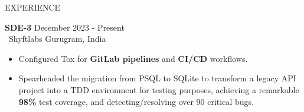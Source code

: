 \documentclass{resume} %
\begin{document}
\begin{rSection}{EXPERIENCE}
		
	\textbf{SDE-3} \hfill December 2023 - Present\\
	\ Shyftlabs \hfill Gurugram, India
	\begin{itemize}
		\itemsep -5pt {}
		\item Configured Tox for \textbf{GitLab pipelines} and \textbf{CI/CD} workflows.
		\item Spearheaded the migration from PSQL to SQLite to transform a legacy API project into a TDD environment for testing purposes, achieving a remarkable \textbf{98\%} test coverage, and detecting/resolving over 90 critical bugs.
	\end{itemize}
		

\end{rSection}
\end{document}
